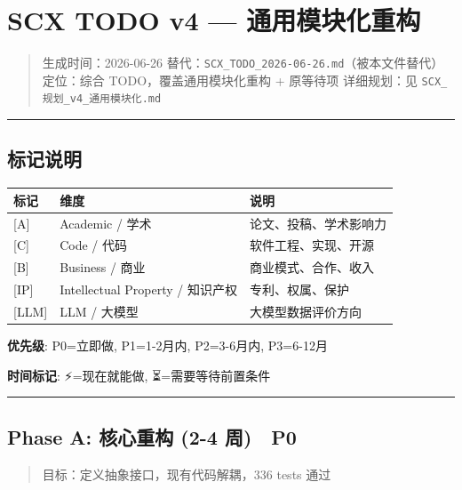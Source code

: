 \documentclass[
  12pt,
]{ctexart}
\author{SCX}
\date{2026}
\begin{document}
\section{SCX TODO v4 ---
通用模块化重构}\label{scx-todo-v4-ux901aux7528ux6a21ux5757ux5316ux91cdux6784}

\begin{quote}
生成时间：2026-06-26
替代：\texttt{SCX\_TODO\_2026-06-26.md}（被本文件替代） 定位：综合
TODO，覆盖通用模块化重构 + 原等待项 详细规划：见
\texttt{SCX\_规划\_v4\_通用模块化.md}
\end{quote}

\begin{center}\rule{0.5\linewidth}{0.5pt}\end{center}

\subsection{标记说明}\label{ux6807ux8bb0ux8bf4ux660e}

\begin{longtable}[]{@{}lll@{}}
\toprule\noalign{}
标记 & 维度 & 说明 \\
\midrule\noalign{}
\endhead
\bottomrule\noalign{}
\endlastfoot
{[}A{]} & Academic / 学术 & 论文、投稿、学术影响力 \\
{[}C{]} & Code / 代码 & 软件工程、实现、开源 \\
{[}B{]} & Business / 商业 & 商业模式、合作、收入 \\
{[}IP{]} & Intellectual Property / 知识产权 & 专利、权属、保护 \\
{[}LLM{]} & LLM / 大模型 & 大模型数据评价方向 \\
\end{longtable}

\textbf{优先级}: P0=立即做, P1=1-2月内, P2=3-6月内, P3=6-12月

\textbf{时间标记}: ⚡=现在就能做, ⏳=需要等待前置条件

\begin{center}\rule{0.5\linewidth}{0.5pt}\end{center}

\subsection{Phase A: 核心重构 (2-4 周) 🔴
P0}\label{phase-a-ux6838ux5fc3ux91cdux6784-2-4-ux5468-p0}

\begin{quote}
目标：定义抽象接口，现有代码解耦，336 tests 通过
\end{quote}
\end{document}
